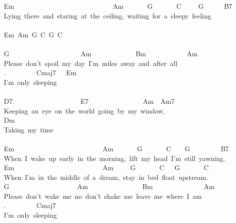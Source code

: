 {Em\ \ \ \ \ \ \ \ \ \ \ \ \ \ \ \ \ \ \ \ \ \ \ \ \ \ \ \ \ Am\ \ \ \ \ \ \ G\ \ \ \ \ \ \ C\ \ \ \ \ G\ \ \ \ \ \ B7\\
Lying\ there\ and\ staring\ at\ the\ ceiling,\ waiting\ for\ a\ sleepy\ feeling\ \\
\\
Em\ Am\ G\ C\ G\ C\\
\\
G\ \ \ \ \ \ \ \ \ \ \ \ \ \ \ \ \ \ \ \ \ Am\ \ \ \ \ \ \ \ \ \ \ \ \ Bm\ \ \ \ \ \ \ \ \ \ \ \ Am\\
Please\ don't\ spoil\ my\ day\ I'm\ miles\ away\ and\ after\ all\\
.\ \ \ \ \ \ \ \ \ Cmaj7\ \ \ Em\\
I'm\ only\ sleeping\ \ \ \ \ \ \ \ \ \ \ \ \ \ \ \ \ \ \ \ \\
\\
D7\ \ \ \ \ \ \ \ \ \ \ \ \ \ \ \ \ \ \ \ E7\ \ \ \ \ \ \ \ \ \ \ \ \ \ \ \ Am\ \ Am7\\
Keeping\ an\ eye\ on\ the\ world\ going\ by\ my\ window,\\
Dm\\
Taking\ my\ time\\
\\
Em\ \ \ \ \ \ \ \ \ \ \ \ \ \ \ \ \ \ \ \ \ \ \ \ \ \ Am\ \ \ \ \ \ \ G\ \ \ \ \ \ \ C\ \ \ \ G\ \ \ \ \ \ \ \ \ B7\\
When\ I\ wake\ up\ early\ in\ the\ morning,\ lift\ my\ head\ I'm\ still\ yawning.\\
Em\ \ \ \ \ \ \ \ \ \ \ \ \ \ \ \ \ \ \ \ \ \ \ \ \ \ Am\ \ \ \ \ G\ \ \ \ \ \ \ C\ \ \ G\ \ \ \ \ \ \ C\\
When\ I'm\ in\ the\ middle\ of\ a\ dream,\ stay\ in\ bed\ float\ upstream.\\
G\ \ \ \ \ \ \ \ \ \ \ \ \ \ \ \ \ \ \ \ Am\ \ \ \ \ \ \ \ \ \ \ \ \ \ \ \ Bm\ \ \ \ \ \ \ \ \ \ \ \ \ \ \ Am\\
Please\ don't\ wake\ me\ no\ don't\ shake\ me\ leave\ me\ where\ I\ am\\
.\ \ \ \ \ \ \ \ \ Cmaj7\\
I'm\ only\ sleeping\\}
